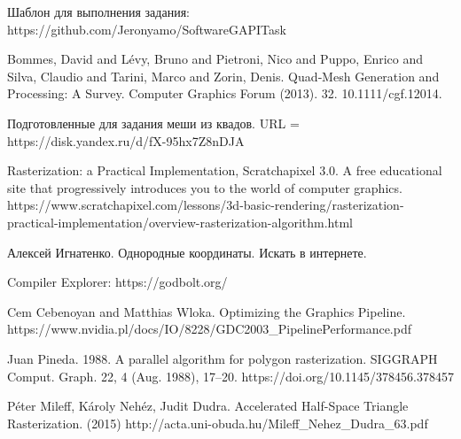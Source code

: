 \documentclass[12pt,subf,href,colorlinks=true]{article}
\begin{document}
\begin{thebibliography}{9}

 Шаблон для выполнения задания: https://github.com/Jeronyamo/SoftwareGAPITask

 Bommes, David and Lévy, Bruno and Pietroni, Nico and Puppo, Enrico and Silva, Claudio and Tarini, Marco and Zorin, Denis. Quad‐Mesh Generation and Processing: A Survey. Computer Graphics Forum (2013). 32. 10.1111/cgf.12014.

 Подготовленные для задания меши из квадов. \newline URL = https://disk.yandex.ru/d/fX-95hx7Z8nDJA

 Rasterization: a Practical Implementation, Scratchapixel 3.0. A free educational site that progressively introduces you to the world of computer graphics. https://www.scratchapixel.com/lessons/3d-basic-rendering/rasterization-practical-implementation/overview-rasterization-algorithm.html

 Алексей Игнатенко. Однородные координаты. Искать в интернете.

 Compiler Explorer: https://godbolt.org/

 Cem Cebenoyan and Matthias Wloka. Optimizing the Graphics Pipeline. https://www.nvidia.pl/docs/IO/8228/GDC2003\_PipelinePerformance.pdf

 Juan Pineda. 1988. A parallel algorithm for polygon rasterization. SIGGRAPH Comput. Graph. 22, 4 (Aug. 1988), 17–20. https://doi.org/10.1145/378456.378457

 Péter Mileff, Károly Nehéz, Judit Dudra.  Accelerated Half-Space Triangle Rasterization. (2015) http://acta.uni-obuda.hu/Mileff\_Nehez\_Dudra\_63.pdf

\end{thebibliography}
\end{document}
